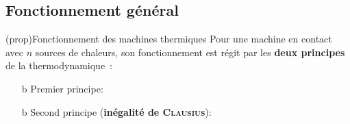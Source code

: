 \documentclass[../../main/main.tex]{subfiles}
\begin{document}
\vspace{-25pt}
\subsection{Fonctionnement général}
\begin{tcb*}[sidebyside](prop){Fonctionnement des machines thermiques}
	Pour une machine en contact avec $n$ sources de chaleurs, son fonctionnement
	est régit par les \textbf{deux principes} de la thermodynamique~:
	\begin{itemize}
		\item[b]{Premier principe}:
		\psw{%
			\[
				\boxed{W + \sum_{i=1}^{n} Q_i = 0}
			\]
		}%
		\vspace{-15pt}
		\item[b]{Second principe} (\textbf{inégalité de \textsc{Clausius}}):
		\psw{%
			\[
				\boxed{\sum_{i=1}^{n} \frac{Q_i}{T_i} \leq 0}
			\]
		}%
	\end{itemize}
	\tcblower
	\begin{center}
\end{center}
\end{tcb*}
\end{document}
